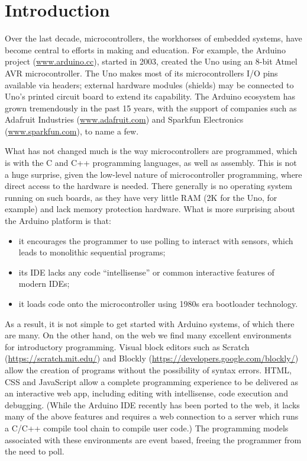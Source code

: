 \section{Introduction}
\label{sec:intro}

Over the last decade, microcontrollers, the workhorses of embedded systems, have become 
central to efforts in making and education. For example, the Arduino project (\url{www.arduino.cc}), 
started in 2003, created the Uno using an 8-bit Atmel 
AVR microcontroller. The Uno makes most of its microcontrollers I/O pins available via headers;
external hardware modules (shields) may be connected to Uno's printed circuit board to extend 
its capability.    The Arduino ecosystem has grown tremendously in the past 15 years, 
with the support of companies such as Adafruit Industries (\url{www.adafruit.com}) and 
Sparkfun Electronics (\url{www.sparkfun.com}), to name a few.

What has not changed much is the way microcontrollers are programmed,
which is with the C and C++ programming languages, as well as assembly.   
This is not a huge surprise, given the low-level nature of microcontroller programming, 
where direct access to the hardware is needed. There generally is no operating 
system running on such boards, as they have very little RAM (2K for the Uno, for example) and 
lack memory protection hardware. What is more surprising about the Arduino platform is that:
\begin{itemize}
\item it encourages the programmer to use polling to interact with sensors, 
which leads to monolithic sequential programs;
\item its IDE lacks any code ``intellisense'' or common interactive features of modern IDEs;
\item it loads code onto the microcontroller using 1980s era bootloader technology.
\end{itemize}
As a result, it is not simple to get started with Arduino systems, of which there are many. 
On the other hand, on the web we find many excellent environments for introductory programming. 
Visual block editors such as Scratch (\url{https://scratch.mit.edu/}) and Blockly (\url{https://developers.google.com/blockly/}) 
allow the creation of programs without the possibility of syntax errors. 
HTML, CSS and JavaScript allow a complete programming experience to be delivered as an interactive 
web app, including editing with intellisense, code execution and debugging. (While the Arduino IDE recently 
has been ported to the web, it lacks many of the above features and requires a web connection to a server which runs 
a C/C++ compile tool chain to compile user code.) The programming models associated with these environments are 
event based, freeing the programmer from the need to poll.

